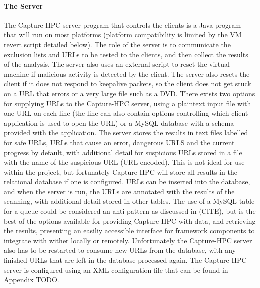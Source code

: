 \paragraph{The Server}
The Capture-HPC server program that controls the clients is a Java program that
will run on most platforms (platform compatibility is limited by the VM revert
script detailed below). The role of the server is to communicate the exclusion
lists and URLs to be tested to the clients, and then collect the results of the
analysis. The server also uses an external script to reset the virtual machine
if malicious activity is detected by the client. The server also resets the
client if it does not respond to keepalive packets, so the client does not get
stuck on a URL that errors or a very large file such as a DVD. There exists two
options for supplying URLs to the
Capture-HPC server, using a plaintext input file with one URL on each line (the
line can also contain options controlling which client application is used to
open the URL) or a MySQL database with a schema provided with the application.
The server stores the results in text files labelled for safe URLs, URLs that
cause an error, dangerous URLS and the current
progress by default, with additional detail for suspicious URLs stored in a file
with the name of the suspicious URL (URL encoded). This is not ideal for use within
the project, but fortunately Capture-HPC will store all results in the
relational database if one is configured. URLs can be inserted into the
database, and when the server is run, the URLs are annotated with the results of
the scanning, with additional detail stored in other tables.
The use of a MySQL table for a queue
could be considered an anti-pattern as discussed in (CITE), but is the best of
the options available for providing Capture-HPC with data, and retrieving the
results, presenting an easiliy accessible interface for framework components to
integrate with wither locally or remotely. Unfortunately the Capture-HPC server
also has to be restarted to
consume new URLs from the database, with any finished URLs that are left in the
database processed again. The Capture-HPC server is configured using an XML
configuration file that can be found in Appendix TODO.
